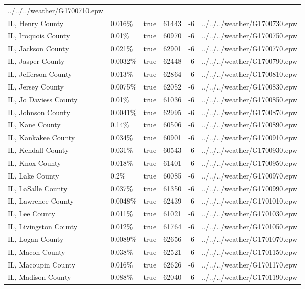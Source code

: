 \begin{longtable}[]{@{}llllll@{}}
../../../weather/G1700710.epw \\
IL, Henry County & 0.016\% & true & 61443 & -6 &
../../../weather/G1700730.epw \\
IL, Iroquois County & 0.01\% & true & 60970 & -6 &
../../../weather/G1700750.epw \\
IL, Jackson County & 0.021\% & true & 62901 & -6 &
../../../weather/G1700770.epw \\
IL, Jasper County & 0.0032\% & true & 62448 & -6 &
../../../weather/G1700790.epw \\
IL, Jefferson County & 0.013\% & true & 62864 & -6 &
../../../weather/G1700810.epw \\
IL, Jersey County & 0.0075\% & true & 62052 & -6 &
../../../weather/G1700830.epw \\
IL, Jo Daviess County & 0.01\% & true & 61036 & -6 &
../../../weather/G1700850.epw \\
IL, Johnson County & 0.0041\% & true & 62995 & -6 &
../../../weather/G1700870.epw \\
IL, Kane County & 0.14\% & true & 60506 & -6 &
../../../weather/G1700890.epw \\
IL, Kankakee County & 0.034\% & true & 60901 & -6 &
../../../weather/G1700910.epw \\
IL, Kendall County & 0.031\% & true & 60543 & -6 &
../../../weather/G1700930.epw \\
IL, Knox County & 0.018\% & true & 61401 & -6 &
../../../weather/G1700950.epw \\
IL, Lake County & 0.2\% & true & 60085 & -6 &
../../../weather/G1700970.epw \\
IL, LaSalle County & 0.037\% & true & 61350 & -6 &
../../../weather/G1700990.epw \\
IL, Lawrence County & 0.0048\% & true & 62439 & -6 &
../../../weather/G1701010.epw \\
IL, Lee County & 0.011\% & true & 61021 & -6 &
../../../weather/G1701030.epw \\
IL, Livingston County & 0.012\% & true & 61764 & -6 &
../../../weather/G1701050.epw \\
IL, Logan County & 0.0089\% & true & 62656 & -6 &
../../../weather/G1701070.epw \\
IL, Macon County & 0.038\% & true & 62521 & -6 &
../../../weather/G1701150.epw \\
IL, Macoupin County & 0.016\% & true & 62626 & -6 &
../../../weather/G1701170.epw \\
IL, Madison County & 0.088\% & true & 62040 & -6 &
../../../weather/G1701190.epw \\

\end{longtable}
